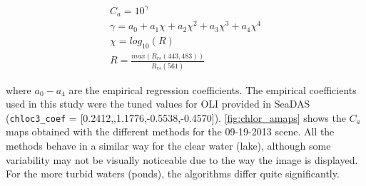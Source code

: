 \begin{equation}
\begin{gathered}
  C_a = 10^{\gamma}\\
  \gamma = a_0+a_1\chi+a_2\chi^2+a_3\chi^3+a_4\chi^4\\
  \chi = log_{10}(R)\\
  R = \frac{max(R_{rs}(443,483))}{R_{rs}(561)}
\end{gathered}
\end{equation}

\noindent where $a_0-a_4$ are the empirical regression coefficients. The empirical coefficients used in this study were the tuned values for OLI provided in SeaDAS ({\tt chloc3\_coef} = [0.2412,,1.1776,-0.5538,-0.4570]).
\autoref{fig:chlor_amaps} shows the $C_a$ maps obtained with the different methods for the 09-19-2013 scene. All the methods behave in a similar way for the clear water (lake), although some variability may not be visually noticeable due to the way the image is displayed. For the more turbid waters (ponds), the algorithms differ quite significantly. 
